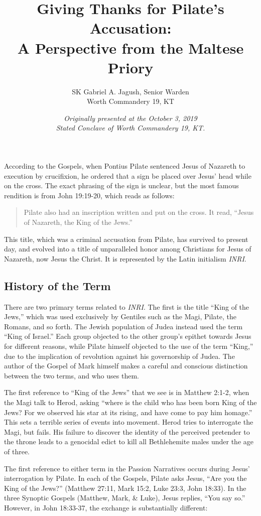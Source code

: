 \documentclass[letterpaper,11pt]{article}
\title{Giving Thanks for Pilate’s Accusation:\\\Large{A Perspective from the Maltese Priory}}
\author{SK Gabriel A. Jagush, Senior Warden\\Worth Commandery \textnumero{} 19, KT}
\date{\emph{Originally presented at the October 3, 2019\\Stated Conclave of Worth Commandery \textnumero{} 19, KT.}}
\begin{document}
	\maketitle
	
	According to the Gospels, when Pontius Pilate sentenced Jesus of Nazareth to execution by crucifixion, he ordered that a sign be placed over Jesus’ head while on the cross. The exact phrasing of the sign is unclear, but the most famous rendition is from John 19:19-20, which reads as follows:
	
	\begin{quote}
		Pilate also had an inscription written and put on the cross. It read, ``Jesus of Nazareth, the King of the Jews.''
	\end{quote}
	
	This title, which was a criminal accusation from Pilate, has survived to present day, and evolved into a title of unparalleled honor among Christians for Jesus of Nazareth, now Jesus the Christ. It is represented by the Latin initialism \emph{INRI}.
	
	\subsection*{History of the Term}
		
	There are two primary terms related to \emph{INRI}. The first is the title ``King of the Jews,'' which was used exclusively by Gentiles such as the Magi, Pilate, the Romans, and so forth. The Jewish population of Judea instead used the term ``King of Israel.'' Each group objected to the other group’s epithet towards Jesus for different reasons, while Pilate himself objected to the use of the term ``King,'' due to the implication of revolution against his governorship of Judea. The author of the Gospel of Mark himself makes a careful and conscious distinction between the two terms, and who uses them.
	
	The first reference to ``King of the Jews'' that we see is in Matthew 2:1-2, when the Magi talk to Herod, asking ``where is the child who has been born King of the Jews? For we observed his star at its rising, and have come to pay him homage.'' This sets a terrible series of events into movement. Herod tries to interrogate the Magi, but fails. His failure to discover the identity of the perceived pretender to the throne leads to a genocidal edict to kill all Bethlehemite males under the age of three.
	
	The first reference to either term in the Passion Narratives occurs during Jesus’ interrogation by Pilate. In each of the Gospels, Pilate asks Jesus, ``Are you the King of the Jews?'' (Matthew 27:11, Mark 15:2, Luke 23:3, John 18:33). In the three Synoptic Gospels (Matthew, Mark, \& Luke), Jesus replies, ``You say so.'' However, in John 18:33-37, the exchange is substantially different:
	
\end{document}
